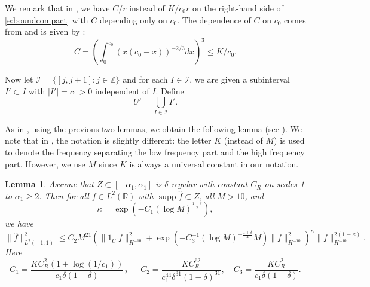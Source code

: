 \documentclass[reqno,12pt,letterpaper]{amsart}
\newtheorem{lem}[prop]{Lemma}
\numberwithin{equation}{section}
\numberwithin{prop}{section}
\DeclareMathOperator{\supp}{supp}
\begin{document}
We remark that in \cite[Lemma 3.2]{fullgap}, we have $C/r$ instead of $K/c_0r$ on the right-hand side of \eqref{e:boundcompact} with $C$ depending only on $c_0$. The dependence of $C$ on $c_0$ comes from \cite[(3.16)]{fullgap} and is given by \cite[Lemma 2.13]{fullgap}:
\begin{equation*}
C=\left(\int_0^{c_0}(x(c_0-x))^{-2/3}dx\right)^3\leq K/c_0.
\end{equation*}


Now let $\mathcal{I}=\{[j,j+1]\colon j\in\mathbb{Z}\}$ and for each $I\in\mathcal{I}$, we are given a subinterval $I'\subset I$ with
$|I'|=c_1>0$ independent of $I$. Define 
\begin{equation*}
U'=\bigcup_{I\in\mathcal{I}}I'.
\end{equation*}

As in \cite[\S 3.3]{fullgap}, using the previous two lemmas, we obtain the following lemma (see \cite[Lemma 3.4]{fullgap}). We note that in \cite{fullgap}, the notation is slightly different: the letter $K$ (instead of $M$) is used to denote the frequency separating the low frequency part and the high frequency part. However, we use $M$ since $K$ is always a universal constant in our notation.


\begin{lem}
\label{p:iterative-1}
Assume that $Z\subset[-\alpha_1,\alpha_1]$ is $\delta$-regular with constant $C_R$ on scales 1 to $\alpha_1\geq2$. Then for all $f\in L^2(\mathbb{R})$ with $\supp\widehat{f}\subset Z$, all $M>10$, and 
\begin{equation*}
\kappa=\exp(-C_1(\log M)^{\frac{1+\delta}{2}}),
\end{equation*}
we have
\begin{equation*}
\|\widehat{f}\|_{L^2(-1,1)}^2
\leq C_2M^{21}
\left(\|1_{U'}f\|_{H^{-10}}^2+\exp(-C_3^{-1}(\log M)^{-\frac{1+\delta}{2}}M)\|f\|_{H^{-10}}^2\right)^{\kappa}\|f\|_{H^{-10}}^{2(1-\kappa)}.
\end{equation*}
Here
\begin{equation}
\label{e:consts}
C_1=\frac{KC_R^2(1+\log(1/c_1))}{c_1\delta(1-\delta)}，
\quad
C_2=\frac{KC_R^{62}}{c_1^{44}\delta^{31}(1-\delta)^{31}},
\quad
C_3=\frac{KC_R^2}{c_1\delta(1-\delta)}.
\end{equation}
\end{lem}
\end{document}
